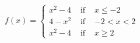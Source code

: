 {${\displaystyle f(x) = \left\{ \begin{array}{rcl} x^2 - 4 & \mbox{ if } &x \leq -2\\
                                                                  4-x^2 & \mbox{ if } & -2 < x < 2 \\
                                                         x^2-4 & \mbox{ if } & x \geq 2 
                                     \end{array} \right. }$}
{
\begin{center}
\end{center}
}